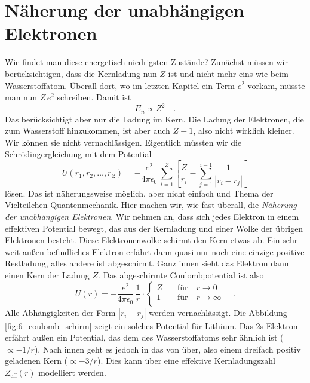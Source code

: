 \section{Näherung der unabhängigen Elektronen}

Wie findet man diese energetisch niedrigsten Zustände? Zunächst müssen wir berücksichtigen, dass die Kernladung nun $Z$ ist und nicht mehr eins wie beim Wasserstoffatom. Überall dort, wo im letzten Kapitel ein Term $e^2$ vorkam, müsste man nun $Z \, e^2$ schreiben. Damit ist 
\begin{equation}
    E_n \propto Z^2  \quad .
\end{equation}
Das  berücksichtigt aber nur die Ladung im Kern. Die Ladung der Elektronen, die zum Wasserstoff hinzukommen, ist aber auch $Z-1$, also nicht wirklich kleiner. Wir können sie nicht vernachlässigen. Eigentlich müssten wir die Schrödingergleichung mit dem Potential
\begin{equation}
    U(r_1, r_2, \dots, r_Z) = -\frac{e^2}{4 \pi \epsilon_0} \, \sum_{i=1}^Z  \left[  \frac{Z}{r_i} - \sum_{j=1}^{i-1}  \frac{1}{|r_i - r_j|} \right]
\end{equation} 
lösen. Das ist näherungsweise möglich, aber nicht einfach und Thema der Vielteilchen-Quantenmechanik. Hier machen wir, wie fast überall, die \emph{Näherung der unabhängigen Elektronen}. Wir nehmen an, dass sich jedes Elektron in einem effektiven Potential bewegt, das aus der Kernladung und einer Wolke der übrigen Elektronen besteht. Diese Elektronenwolke schirmt den Kern etwas ab. Ein sehr weit außen befindliches Elektron erfährt dann quasi nur noch eine einzige positive Restladung, alles andere ist abgeschirmt. Ganz innen sieht das Elektron dann einen Kern der Ladung $Z$. Das abgeschirmte Coulombpotential ist also
\begin{equation}
    U(r) =  -\frac{e^2}{4 \pi \epsilon_0} \, \frac{1}{r} \cdot
    \left\{
 \begin{matrix}
     Z \quad  & \text{für} \quad  r  \rightarrow  0 \\
     1     & \text{für} \quad  r \rightarrow \infty \\
 \end{matrix}
    \right. \quad .
\end{equation}
Alle Abhängigkeiten der Form $|r_i - r_j|$ werden vernachlässigt. Die Abbildung \ref{fig:6_coulomb_schirm}
zeigt ein solches Potential für Lithium. Das 2s-Elektron erfährt außen ein Potential, das dem des Wasserstoffatoms sehr ähnlich ist ($\propto -1/r$). Nach innen geht es jedoch in das von  über, also einem dreifach positiv geladenen Kern ($\propto - 3/r$). Dies kann über eine effektive Kernladungszahl $Z_\text{eff}(r)$ modelliert werden.


